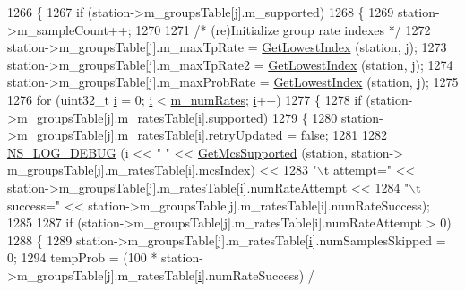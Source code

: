 \begin{DoxyCode}
1266     \{
1267       \textcolor{keywordflow}{if} (station->m\_groupsTable[j].m\_supported)
1268         \{
1269           station->m\_sampleCount++;
1270 
1271           \textcolor{comment}{/* (re)Initialize group rate indexes */}
1272           station->m\_groupsTable[j].m\_maxTpRate = \hyperlink{classns3_1_1MinstrelHtWifiManager_ae4e498be04ca255831cdf42d9ff24eec}{GetLowestIndex} (station, j);
1273           station->m\_groupsTable[j].m\_maxTpRate2 = \hyperlink{classns3_1_1MinstrelHtWifiManager_ae4e498be04ca255831cdf42d9ff24eec}{GetLowestIndex} (station, j);
1274           station->m\_groupsTable[j].m\_maxProbRate = \hyperlink{classns3_1_1MinstrelHtWifiManager_ae4e498be04ca255831cdf42d9ff24eec}{GetLowestIndex} (station, j);
1275 
1276           \textcolor{keywordflow}{for} (uint32\_t \hyperlink{bernuolliDistribution_8m_a6f6ccfcf58b31cb6412107d9d5281426}{i} = 0; \hyperlink{bernuolliDistribution_8m_a6f6ccfcf58b31cb6412107d9d5281426}{i} < \hyperlink{classns3_1_1MinstrelHtWifiManager_a2f3d0e7f6c298a40dbc8699805103142}{m\_numRates}; \hyperlink{bernuolliDistribution_8m_a6f6ccfcf58b31cb6412107d9d5281426}{i}++)
1277             \{
1278               \textcolor{keywordflow}{if} (station->m\_groupsTable[j].m\_ratesTable[\hyperlink{bernuolliDistribution_8m_a6f6ccfcf58b31cb6412107d9d5281426}{i}].supported)
1279                 \{
1280                   station->m\_groupsTable[j].m\_ratesTable[\hyperlink{bernuolliDistribution_8m_a6f6ccfcf58b31cb6412107d9d5281426}{i}].retryUpdated = \textcolor{keyword}{false};
1281 
1282                   \hyperlink{group__logging_ga413f1886406d49f59a6a0a89b77b4d0a}{NS\_LOG\_DEBUG} (i << \textcolor{stringliteral}{" "} << \hyperlink{classns3_1_1WifiRemoteStationManager_af21ecff608cea2837c1af9385bbe6e4e}{GetMcsSupported} (station,  station->
      m\_groupsTable[j].m\_ratesTable[i].mcsIndex) <<
1283                                 \textcolor{stringliteral}{"\(\backslash\)t attempt="} << station->m\_groupsTable[j].m\_ratesTable[i].numRateAttempt 
      <<
1284                                 \textcolor{stringliteral}{"\(\backslash\)t success="} << station->m\_groupsTable[j].m\_ratesTable[i].numRateSuccess);
1285 
1287                   \textcolor{keywordflow}{if} (station->m\_groupsTable[j].m\_ratesTable[i].numRateAttempt > 0)
1288                     \{
1289                       station->m\_groupsTable[j].m\_ratesTable[\hyperlink{bernuolliDistribution_8m_a6f6ccfcf58b31cb6412107d9d5281426}{i}].numSamplesSkipped = 0;
1294                       tempProb = (100 * station->m\_groupsTable[j].m\_ratesTable[\hyperlink{bernuolliDistribution_8m_a6f6ccfcf58b31cb6412107d9d5281426}{i}].numRateSuccess) / 

\end{DoxyCode}
